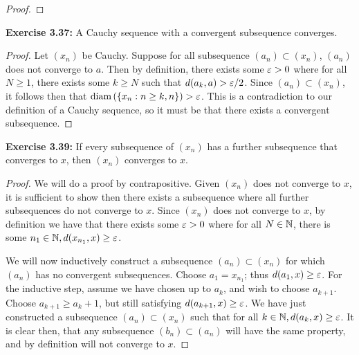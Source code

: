 \documentclass{exam}
\begin{document}
\begin{questions}
\begin{proof}
    \end{proof}


    \newpage
    \question \textbf{Exercise 3.37:} A Cauchy sequence with a convergent subsequence converges.
    \begin{proof}
        Let $(x_n)$ be Cauchy. Suppose for all subsequence $(a_n) \subset (x_n)$, $(a_n)$ does not converge to $a$. Then by definition, 
        there exists some $\varepsilon > 0$ where for all $N\geq 1$, there exists some $k\geq N$ such that $d(a_k, a) > \varepsilon / 2$. Since 
        $(a_n) \subset (x_n)$, it follows then that $\text{diam}\left( \left \{ x_n : n \geq k, n \right \} \right) > \varepsilon$. This is a contradiction to our
        definition of a Cauchy sequence, so it must be that there exists a convergent subsequence.
    \end{proof}


    \newpage
    \question \textbf{Exercise 3.39:} If every subsequence of $(x_n)$ has a further subsequence that converges to $x$, then $(x_n)$ converges to $x$.
    \begin{proof}
        We will do a proof by contrapositive. Given $(x_n)$ does not converge to $x$, it is sufficient to show then there exists a 
        subsequence where all further subsequences do not converge to $x$. Since $(x_n)$ does not converge to $x$, by definition
        we have that there exists some $\varepsilon > 0$ where for all $N\in\mathbb {N}$, there is some $n_1\in\mathbb {N}, d(x_{n_1}, x) \geq \varepsilon$.

        We will now inductively construct a subsequence $(a_n) \subset (x_n)$ for which $(a_n)$ has no convergent subsequences.
        Choose $a_1 = x_{n_1}$; thus $d(a_1, x) \geq \varepsilon$. For the inductive step, assume we have chosen up to $a_k$, and wish
        to choose $a_{k + 1}$. Choose $a_{k + 1} \geq a_k + 1$, but still satisfying $d(a_{k + 1}, x)\geq \varepsilon$. We have just constructed
        a subsequence $(a_n) \subset (x_n)$ such that for all $k\in\mathbb {N}, d(a_k, x)\geq \varepsilon$. It is clear then, that any subsequence
        $(b_n) \subset (a_n)$ will have the same property, and by definition will not converge to $x$.
    \end{proof}


\end{questions}
\end{document}
